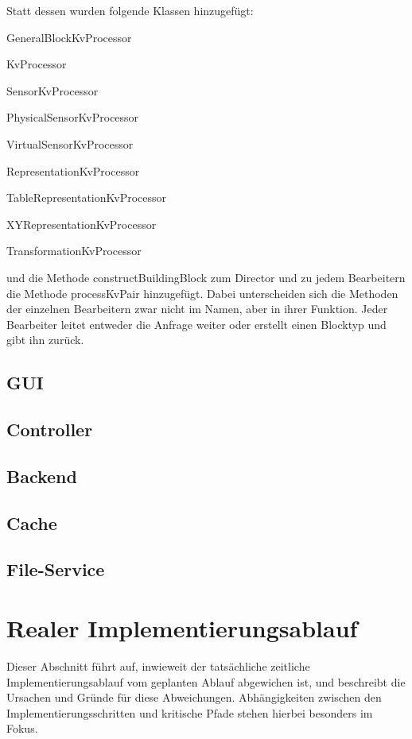 \documentclass[parskip=full]{scrartcl}
\begin{document}
Statt dessen wurden folgende Klassen hinzugefügt:
\begin{description}
\item{} GeneralBlockKvProcessor
\item{} KvProcessor
\item{} SensorKvProcessor
\item{} PhysicalSensorKvProcessor
\item{} VirtualSensorKvProcessor
\item{} RepresentationKvProcessor
\item{} TableRepresentationKvProcessor
\item{} XYRepresentationKvProcessor
\item{} TransformationKvProcessor
\end{description}

und die Methode constructBuildingBlock zum Director und zu jedem Bearbeitern die Methode processKvPair hinzugefügt. Dabei unterscheiden sich die Methoden der einzelnen Bearbeitern zwar nicht im Namen, aber in ihrer Funktion. Jeder Bearbeiter leitet entweder die Anfrage weiter oder erstellt einen Blocktyp und gibt ihn zurück. 

\subsection{GUI}

\subsection{Controller}

\subsection{Backend}

\subsection{Cache}

\subsection{File-Service}

\section{Realer Implementierungsablauf}

Dieser Abschnitt führt auf, inwieweit der tatsächliche zeitliche Implementierungsablauf vom geplanten Ablauf abgewichen ist, und beschreibt die Ursachen und Gründe für diese Abweichungen. Abhängigkeiten zwischen den Implementierungsschritten und kritische Pfade stehen hierbei besonders im Fokus.
\end{document}
